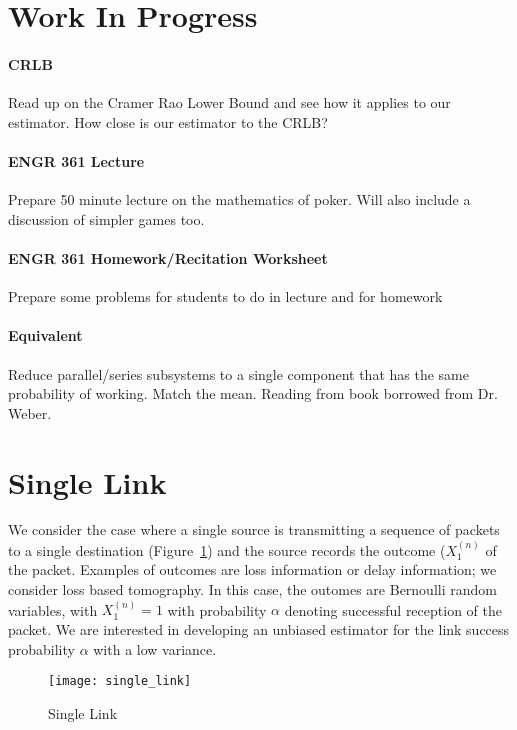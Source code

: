\documentclass[11pt]{article}
\begin{document}
\setcounter{section}{-1}
\section{Work In Progress}

\paragraph{CRLB}
Read up on the Cramer Rao Lower Bound and see how it applies to our estimator. How close is our estimator to the CRLB?

\paragraph{ENGR 361 Lecture}
Prepare 50 minute lecture on the mathematics of poker. Will also include a discussion of simpler games too.

\paragraph{ENGR 361 Homework/Recitation Worksheet}
Prepare some problems for students to do in lecture and for homework

\paragraph{Equivalent}
Reduce parallel/series subsystems to a single component that has the same probability of working. Match the mean. Reading from book borrowed from Dr. Weber.

\section{Single Link}
We consider the case where a single source is transmitting a sequence of packets to a single destination (Figure~\ref{fig:single_link}) and the source records the outcome ($X_{1}^{(n)}$ of the packet. Examples of outcomes are loss information or delay information; we consider loss based tomography. In this case, the outomes are Bernoulli random variables, with $X_{1}^{(n)}=1$ with probability $\alpha$ denoting successful reception of the packet. We are interested in developing an unbiased estimator for the link success probability $\alpha$ with a low variance.

\begin{figure}[ht!]
\centering
\texttt{[image: single\_link]}
\caption{Single Link}\label{fig:single_link}
\end{figure}
\end{document}
